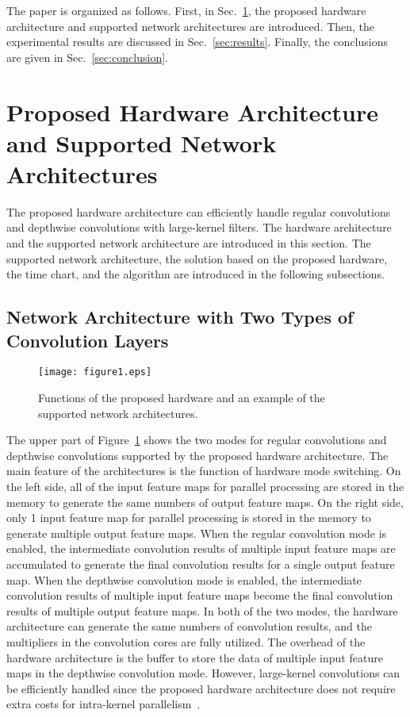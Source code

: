 \documentclass[runningheads]{llncs}
\begin{document}
The paper is organized as follows. First, in Sec.~\ref{sec:proposed}, the proposed hardware architecture and supported network architectures are introduced. Then, the experimental results are discussed in Sec.~\ref{sec:results}. Finally, the conclusions are given in Sec.~\ref{sec:conclusion}.

\section{Proposed Hardware Architecture and Supported Network Architectures}
\label{sec:proposed}

The proposed hardware architecture can efficiently handle regular convolutions and depthwise convolutions with large-kernel filters. The hardware architecture and the supported network architecture are introduced in this section. The supported network architecture, the solution based on the proposed hardware, the time chart, and the algorithm are introduced in the following subsections.



\subsection{Network Architecture with Two Types of Convolution Layers}
\label{subsec:network}

\begin{figure}
\centering
\texttt{[image: figure1.eps]}
\caption{Functions of the proposed hardware and an example of the supported network architectures.}
\label{fig:network}
\end{figure}

The upper part of Figure~\ref{fig:network} shows the two modes for regular convolutions and depthwise convolutions supported by the proposed hardware architecture. The main feature of the architectures is the function of hardware mode switching. On the left side, all of the input feature maps for parallel processing are stored in the memory to generate the same numbers of output feature maps. On the right side, only 1 input feature map for parallel processing is stored in the memory to generate multiple output feature maps. When the regular convolution mode is enabled, the intermediate convolution results of multiple input feature maps are accumulated to generate the final convolution results for a single output feature map. When the depthwise convolution mode is enabled, the intermediate convolution results of multiple input feature maps become the final convolution results of multiple output feature maps. In both of the two modes, the hardware architecture can generate the same numbers of convolution results, and the multipliers in the convolution cores are fully utilized. The overhead of the hardware architecture is the buffer to store the data of multiple input feature maps in the depthwise convolution mode. However, large-kernel convolutions can be efficiently handled since the proposed hardware architecture does not require extra costs for intra-kernel parallelism~\cite{Yu20}.
\end{document}
